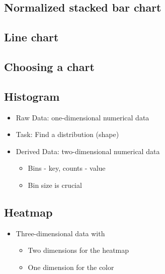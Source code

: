 \subsection{Normalized stacked bar chart}

\subsection{Line chart}

\subsection{Choosing a chart}

\subsection{Histogram}
\begin{definition}
    
    \begin{itemize}
        \item Raw Data: one-dimensional numerical data
        \item Task: Find a distribution (shape)
        \item Derived Data: two-dimensional numerical data
            \begin{itemize}
                \item Bins - key, counts - value
                \item Bin size is crucial
            \end{itemize}
    \end{itemize}
\end{definition}

\subsection{Heatmap}
\begin{definition}
    
    \begin{itemize}
        \item Three-dimensional data with
            \begin{itemize}
                \item Two dimensions for the heatmap
                \item One dimension for the color
            \end{itemize}
    \end{itemize}
\end{definition}

